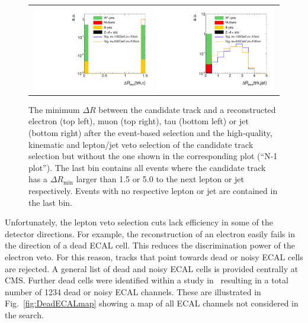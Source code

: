 \begin{figure}[!t]
\begin{tabular}{c}
    \includegraphics[width=0.49\textwidth]{figures/analysis/AnalysisSelection/htrackdRminTau_log.pdf}
    \includegraphics[width=0.49\textwidth]{figures/analysis/AnalysisSelection/htrackdRminJet_log.pdf}
  \end{tabular}
  \caption{The minimum $\Delta R$ between the candidate track and a reconstructed electron (top left), muon (top right), tau (bottom left) or jet (bottom right) 
           after the event-based selection and the high-quality, kinematic and lepton/jet veto selection of the candidate track selection but without the one shown in the corresponding plot (``N-1 plot''). 
           The last bin contains all events where the candidate track has a $\Delta R_{\text{min}}$ larger than 1.5 or 5.0 to the next lepton or jet respectively. 
           Events with no respective lepton or jet are contained in the last bin.  }
  \label{fig:TrackdRmin}
  \vspace{25pt}
\end{figure}

Unfortunately, the lepton veto selection cuts lack efficiency in some of the detector directions.
For example, the reconstruction of an electron easily fails in the direction of a dead ECAL cell.
This reduces the discrimination power of the electron veto.
For this reason, tracks that point towards dead or noisy ECAL cells are rejected.
A general list of dead and noisy ECAL cells is provided centrally at CMS.
Further dead cells were identified within a study in~\cite{bib:CMS:DT_Thesis,bib:CMS:DT_8TeV_AN} resulting in a total number of 1234 dead or noisy ECAL channels. 
These are illustrated in Fig.~\ref{fig:DeadECALmap} showing a map of all ECAL channels not considered in the search.


